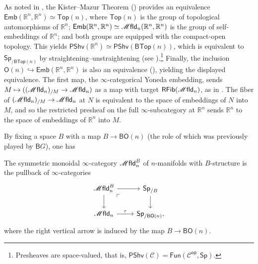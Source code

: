 \documentclass[../text]{subfiles}
\begin{document}
\begin{remark}\label{rem:explaining_tau}
    As noted in \cite{af_fhtop}, the Kister--Mazur Theorem (\cite{kister1964microbundles}) provides an equivalence $\mathsf{Emb}(\mathbb{R}^n,\mathbb{R}^n)\simeq \mathsf{Top}(n)$, where $\mathsf{Top}(n)$ is the group of topological automorphisms of $\mathbb{R}^n$; $\mathsf{Emb}(\mathbb{R}^n,\mathbb{R}^n)\simeq\mfld_n(\mathbb{R}^n,\mathbb{R}^n)$ is the group of self-embeddings of $\mathbb{R}^n$; and both groups are equipped with the compact-open topology. This yields $\mathsf{PShv}(\mathbb{R}^n)\simeq\mathsf{PShv}(\mathsf{BTop}(n))$, which is equivalent to $\mathsf{Sp}_{/\mathsf{BTop}(n)}$ by straightening--unstraightening (see ).\footnote{Presheaves are space-valued, that is, $\mathsf{PShv}(\mathscr{C})=\mathsf{Fun}(\mathscr{C}^{\mathsf{op}},\mathsf{Sp})$.} Finally, the inclusion $\mathsf{O}(n)\hookrightarrow\mathsf{Emb}(\mathbb{R}^n,\mathbb{R}^n)$ is also an equivalence (\cite[Proposition 2.2.6]{af_primer}), yielding the displayed equivalence. The first map, the $\infty$-categorical Yoneda embedding, sends $M\mapsto((\mfld_{n})_{/M}\to\mfld_n)$ as a map with target $\mathsf{RFib}(\mfld_n)$, as in \cite{lurie_htt}. The fiber of $(\mfld_{n})_{/M}\to\mfld_n$ at $N$ is equivalent to the space of embeddings of $N$ into $M$, and so the restricted presheaf on the full $\infty$-subcategory at $\mathbb{R}^n$ sends $\mathbb{R}^n$ to the space of embeddings of $\mathbb{R}^n$ into $M$. 
\end{remark}

By fixing a space $B$ with a map $B \rightarrow \mathsf{BO}(n)$ (the role of which was previously played by $\mathsf{B}G$), one has
%
\begin{definition}
    The symmetric monoidal $\infty$-category $\mfld_n^B$ of $n$-manifolds with $B$-structure is the pullback of $\infty$-categories
    \begin{equation}
        \begin{tikzcd}
            \mfld_n^B \arrow[dr, phantom, "\ulcorner", very near start] \arrow[r] \arrow[d] & \mathsf{Sp}_{/B} \arrow[d] \\
            \mfld_n \arrow[r, "\tau"] & \mathsf{Sp}_{/\mathsf{BO}(n)},
        \end{tikzcd}
    \end{equation}
    where the right vertical arrow is induced by the map $B \rightarrow \mathsf{BO}(n)$.
\end{definition}
\end{document}

